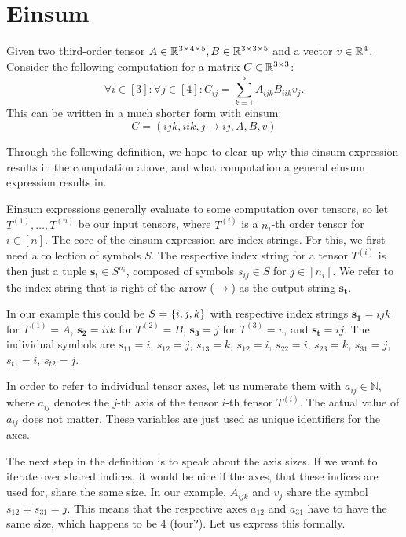 \section{Einsum}
Given two third-order tensor $A \in \mathbb{R}^{3 \times 4 \times 5}, B \in \mathbb{R}^{3 \times 3 \times 5}$ and a vector $v \in \mathbb{R}^4$.
Consider the following computation for a matrix $C \in \mathbb{R}^{3 \times 3}$:
$$\forall i \in [3]: \forall j \in [4]: C_{ij} = \sum\limits_{k = 1}^{5} A_{ijk} B_{iik} v_j.$$
This can be written in a much shorter form with einsum:
$$C = (ijk, iik, j \rightarrow ij, A, B, v)$$

Through the following definition, we hope to clear up why this einsum expression results in the computation above,
and what computation a general einsum expression results in.

\begin{definition}
    Einsum expressions generally evaluate to some computation over tensors, so let $T^{(1)},\dots,T^{(n)}$ be our input tensors,
    where $T^{(i)}$ is a $n_i$-th order tensor for $i \in [n]$.
    The core of the einsum expression are index strings. For this, we first need a collection of symbols $S$.
    The respective index string for a tensor $T^{(i)}$ is then just a tuple $\bm{s_i} \in S^{n_i}$,
    composed of symbols $s_{ij} \in S$ for $j \in [n_i]$.
    We refer to the index string that is right of the arrow ($\rightarrow$) as the output string $\bm{s_t}$.

    In our example this could be $S = \lbrace i,j,k \rbrace$ with respective index strings
    $\bm{s_1} = ijk$ for $T^{(1)} = A$,
    $\bm{s_2} = iik$ for $T^{(2)} = B$,
    $\bm{s_3} = j$ for $T^{(3)} = v$,
    and $\bm{s_t} = ij$.
    The individual symbols are $s_{11} = i$, $s_{12} = j$, $s_{13} = k$, $s_{12} = i$, $s_{22} = i$, $s_{23} = k$, $s_{31} = j$, $s_{t1} = i$, $s_{t2} = j$.

    In order to refer to individual tensor axes, let us numerate them with $a_{ij} \in \mathbb{N}$,
    where $a_{ij}$ denotes the $j$-th axis of the tensor $i$-th tensor $T^{(i)}$.
    The actual value of $a_{ij}$ does not matter.
    These variables are just used as unique identifiers for the axes.

    The next step in the definition is to speak about the axis sizes.
    If we want to iterate over shared indices, it would be nice if the axes, that these indices are used for, share the same size.
    In our example, $A_{ijk}$ and $v_j$ share the symbol $s_{12} = s_{31} = j$.
    This means that the respective axes $a_{12}$ and $a_{31}$ have to have the same size, which happens to be 4 (four?).
    Let us express this formally.


\end{definition}
